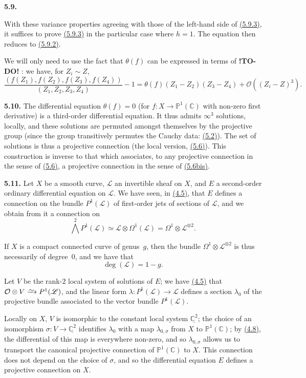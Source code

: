 \documentclass{report}
\newenvironment{rmenv}[1]
  {\phantomsection\par\medskip\noindent\textbf{#1.}\rmfamily}
  {\par\medskip}
\newcommand{\scr}[1]{{\mathscr{#1}}}
\renewcommand{\cal}[1]{{\mathcal{#1}}}
\newcommand{\PP}{\mathbb{P}}
\newcommand{\CC}{\mathbb{C}}
\newcommand{\simto}{\xrightarrow{\raisebox{-0.7ex}[0ex][0ex]{$\sim$}}}
\newcommand{\todo}{\textbf{ !TO-DO! }}
\newcommand{\oldpage}[1]{\marginpar{\footnotesize$\Big\vert$ \textit{p.~#1}}}
\begin{document}
\begin{rmenv}{5.9}
\begin{enumerate}[(i)]
      With these variance properties agreeing with those of the left-hand side of \hyperref[I.5.9.3]{(5.9.3)}, it suffices to prove \hyperref[I.5.9.3]{(5.9.3)} in the particular case where $h=1$.
      The equation then reduces to \hyperref[I.5.9.2]{(5.9.2)}.
  \end{enumerate}

  We will only need to use the fact that $\theta(f)$ can be expressed in terms of \todo:
  we have, for $Z_i\sim Z$,
  \[
  \label{I.5.9.4}
    \frac{(f(Z_1),f(Z_2),f(Z_3),f(Z_4))}{(Z_1,Z_2,Z_3,Z_4)} - 1
    = \theta(f)(Z_1-Z_2)(Z_3-Z_4) + \mathcal{O}((Z_i-Z)^3).
  \tag{5.9.4}
  \]
\end{rmenv}

\oldpage{35}
\begin{rmenv}{5.10}
\label{I.5.10}
  The differential equation $\theta(f)=0$ (for $f\colon X\to\PP^1(\CC)$ with non-zero first derivative) is a third-order differential equation.
  It thus admits $\infty^3$ solutions, locally, and these solutions are permuted amongst themselves by the projective group (since the group transitively permutes the Cauchy data: \hyperref[I.5.2]{(5.2)}).
  The set of solutions is thus a projective connection (the local version, \hyperref[I.5.6]{(5.6)}).
  This construction is inverse to that which associates, to any projective connection in the sense of \hyperref[I.5.6]{(5.6)}, a projective connection in the sense of \hyperref[I.5.6bis]{(5.6bis)}.
\end{rmenv}

\begin{rmenv}{5.11}
\label{I.5.11}
  Let $X$ be a smooth curve, $\scr{L}$ an invertible sheaf on $X$, and $E$ a second-order ordinary differential equation on $\scr{L}$.
  We have seen, in \hyperref[I.4.5]{(4.5)}, that $E$ defines a connection on the bundle $P^1(\scr{L})$ of first-order jets of sections of $\scr{L}$, and we obtain from it a connection on
  \[
    \bigwedge^2 P^1(\scr{L}) \simeq \scr{L}\otimes\Omega^1(\scr{L}) = \Omega^1\otimes\scr{L}^{\otimes2}.
  \]

  If $X$ is a compact connected curve of genus~$g$, then the bundle $\Omega^1\otimes\scr{L}^{\otimes2}$ is thus necessarily of degree~$0$, and we have that
  \[
    \deg(\scr{L}) = 1-g.
  \]

  Let $V$ be the rank-$2$ local system of solutions of $E$;
  we have \hyperref[I.4.5]{(4.5)} that $\cal{O}\otimes V\simto P^1(\scr{L})$, and the linear form $\lambda\colon P^1(\scr{L})\to\scr{L}$ defines a section $\lambda_0$ of the projective bundle associated to the vector bundle $P^1(\scr{L})$.

  Locally on $X$, $V$ is isomorphic to the constant local system $\underline{\CC^2}$;
  the choice of an isomorphism $\sigma\colon V\to\underline{\CC^2}$ identifies $\lambda_0$ with a map $\lambda_{0,\sigma}$ from $X$ to $\PP^1(\CC)$;
  by \hyperref[I.4.8]{(4.8)}, the differential of this map is everywhere non-zero, and so $\lambda_{0,\sigma}$ allows us to transport the canonical projective connection of $\PP^1(\CC)$ to $X$.
  This connection does not depend on the choice of $\sigma$, and so the differential equation $E$ defines a projective connection on $X$.
\end{rmenv}
\end{document}
